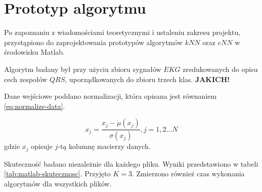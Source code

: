 \section{Prototyp algorytmu}
Po zapoznaniu z wiadomościami teoretycznymi i ustaleniu zakresu projektu, przystąpiono do zaprojektowania prototypów algorytmów $kNN$ oraz $eNN$ w środowisku Matlab.

Algorytm badany był przy użyciu zbioru sygnałów $EKG$ zredukowanych do opisu cech zespołów $QRS$, uporządkowanych do zbioru trzech klas. \textbf{JAKICH!}

Dane wejściowe poddano normalizacji, która opisana jest równaniem \ref{eq:normalize-data}.

\begin{equation}
\label{eq:normalize-data}
x_j = \frac{x_j - \mu(x_j)}{\sigma(x_j)}, j=1,2...N
\end{equation}
gdzie $x_j$ opisuje $j$-tą kolumnę macierzy danych.

Skuteczność badano niezależnie dla każdego pliku. Wyniki przedstawiono w tabeli \ref{tab:matlab-skutecznosc}. Przyjęto $K=3$. Zmierzono również czas wykonania algorytmów dla wszystkich plików.

